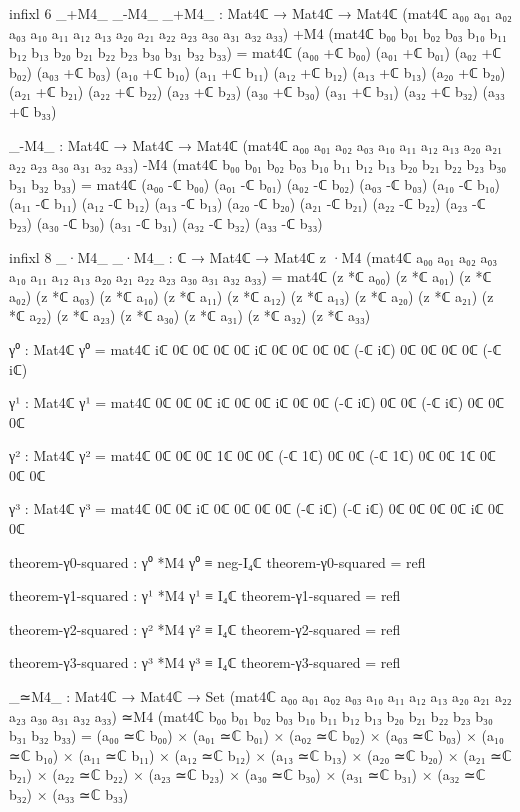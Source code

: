 \documentclass[11pt,a4paper]{book}
\begin{document}
\begin{code}
infixl 6 _+M4_ _-M4_
_+M4_ : Mat4ℂ → Mat4ℂ → Mat4ℂ
(mat4ℂ a₀₀ a₀₁ a₀₂ a₀₃ a₁₀ a₁₁ a₁₂ a₁₃
       a₂₀ a₂₁ a₂₂ a₂₃ a₃₀ a₃₁ a₃₂ a₃₃) +M4
 (mat4ℂ b₀₀ b₀₁ b₀₂ b₀₃ b₁₀ b₁₁ b₁₂ b₁₃
        b₂₀ b₂₁ b₂₂ b₂₃ b₃₀ b₃₁ b₃₂ b₃₃) =
  mat4ℂ (a₀₀ +ℂ b₀₀) (a₀₁ +ℂ b₀₁) (a₀₂ +ℂ b₀₂) (a₀₃ +ℂ b₀₃)
         (a₁₀ +ℂ b₁₀) (a₁₁ +ℂ b₁₁) (a₁₂ +ℂ b₁₂) (a₁₃ +ℂ b₁₃)
         (a₂₀ +ℂ b₂₀) (a₂₁ +ℂ b₂₁) (a₂₂ +ℂ b₂₂) (a₂₃ +ℂ b₂₃)
         (a₃₀ +ℂ b₃₀) (a₃₁ +ℂ b₃₁) (a₃₂ +ℂ b₃₂) (a₃₃ +ℂ b₃₃)

_-M4_ : Mat4ℂ → Mat4ℂ → Mat4ℂ
(mat4ℂ a₀₀ a₀₁ a₀₂ a₀₃ a₁₀ a₁₁ a₁₂ a₁₃
       a₂₀ a₂₁ a₂₂ a₂₃ a₃₀ a₃₁ a₃₂ a₃₃) -M4
 (mat4ℂ b₀₀ b₀₁ b₀₂ b₀₃ b₁₀ b₁₁ b₁₂ b₁₃
        b₂₀ b₂₁ b₂₂ b₂₃ b₃₀ b₃₁ b₃₂ b₃₃) =
  mat4ℂ (a₀₀ -ℂ b₀₀) (a₀₁ -ℂ b₀₁) (a₀₂ -ℂ b₀₂) (a₀₃ -ℂ b₀₃)
         (a₁₀ -ℂ b₁₀) (a₁₁ -ℂ b₁₁) (a₁₂ -ℂ b₁₂) (a₁₃ -ℂ b₁₃)
         (a₂₀ -ℂ b₂₀) (a₂₁ -ℂ b₂₁) (a₂₂ -ℂ b₂₂) (a₂₃ -ℂ b₂₃)
         (a₃₀ -ℂ b₃₀) (a₃₁ -ℂ b₃₁) (a₃₂ -ℂ b₃₂) (a₃₃ -ℂ b₃₃)

infixl 8 _·M4_
_·M4_ : ℂ → Mat4ℂ → Mat4ℂ
z ·M4 (mat4ℂ a₀₀ a₀₁ a₀₂ a₀₃ a₁₀ a₁₁ a₁₂ a₁₃
              a₂₀ a₂₁ a₂₂ a₂₃ a₃₀ a₃₁ a₃₂ a₃₃) =
  mat4ℂ (z *ℂ a₀₀) (z *ℂ a₀₁) (z *ℂ a₀₂) (z *ℂ a₀₃)
         (z *ℂ a₁₀) (z *ℂ a₁₁) (z *ℂ a₁₂) (z *ℂ a₁₃)
         (z *ℂ a₂₀) (z *ℂ a₂₁) (z *ℂ a₂₂) (z *ℂ a₂₃)
         (z *ℂ a₃₀) (z *ℂ a₃₁) (z *ℂ a₃₂) (z *ℂ a₃₃)

γ⁰ : Mat4ℂ
γ⁰ = mat4ℂ iℂ 0ℂ 0ℂ 0ℂ
            0ℂ iℂ 0ℂ 0ℂ
            0ℂ 0ℂ (-ℂ iℂ) 0ℂ
            0ℂ 0ℂ 0ℂ (-ℂ iℂ)

γ¹ : Mat4ℂ
γ¹ = mat4ℂ 0ℂ 0ℂ 0ℂ iℂ
            0ℂ 0ℂ iℂ 0ℂ
            0ℂ (-ℂ iℂ) 0ℂ 0ℂ
            (-ℂ iℂ) 0ℂ 0ℂ 0ℂ

γ² : Mat4ℂ
γ² = mat4ℂ 0ℂ 0ℂ 0ℂ 1ℂ
            0ℂ 0ℂ (-ℂ 1ℂ) 0ℂ
            0ℂ (-ℂ 1ℂ) 0ℂ 0ℂ
            1ℂ 0ℂ 0ℂ 0ℂ

γ³ : Mat4ℂ
γ³ = mat4ℂ 0ℂ 0ℂ iℂ 0ℂ
            0ℂ 0ℂ 0ℂ (-ℂ iℂ)
            (-ℂ iℂ) 0ℂ 0ℂ 0ℂ
            0ℂ iℂ 0ℂ 0ℂ

theorem-γ0-squared : γ⁰ *M4 γ⁰ ≡ neg-I₄ℂ
theorem-γ0-squared = refl

theorem-γ1-squared : γ¹ *M4 γ¹ ≡ I₄ℂ
theorem-γ1-squared = refl

theorem-γ2-squared : γ² *M4 γ² ≡ I₄ℂ
theorem-γ2-squared = refl

theorem-γ3-squared : γ³ *M4 γ³ ≡ I₄ℂ
theorem-γ3-squared = refl

_≃M4_ : Mat4ℂ → Mat4ℂ → Set
(mat4ℂ a₀₀ a₀₁ a₀₂ a₀₃ a₁₀ a₁₁ a₁₂ a₁₃
       a₂₀ a₂₁ a₂₂ a₂₃ a₃₀ a₃₁ a₃₂ a₃₃) ≃M4
 (mat4ℂ b₀₀ b₀₁ b₀₂ b₀₃ b₁₀ b₁₁ b₁₂ b₁₃
        b₂₀ b₂₁ b₂₂ b₂₃ b₃₀ b₃₁ b₃₂ b₃₃) =
  (a₀₀ ≃ℂ b₀₀) × (a₀₁ ≃ℂ b₀₁) × (a₀₂ ≃ℂ b₀₂) × (a₀₃ ≃ℂ b₀₃) ×
  (a₁₀ ≃ℂ b₁₀) × (a₁₁ ≃ℂ b₁₁) × (a₁₂ ≃ℂ b₁₂) × (a₁₃ ≃ℂ b₁₃) ×
  (a₂₀ ≃ℂ b₂₀) × (a₂₁ ≃ℂ b₂₁) × (a₂₂ ≃ℂ b₂₂) × (a₂₃ ≃ℂ b₂₃) ×
  (a₃₀ ≃ℂ b₃₀) × (a₃₁ ≃ℂ b₃₁) × (a₃₂ ≃ℂ b₃₂) × (a₃₃ ≃ℂ b₃₃)


\end{code}
\end{document}
